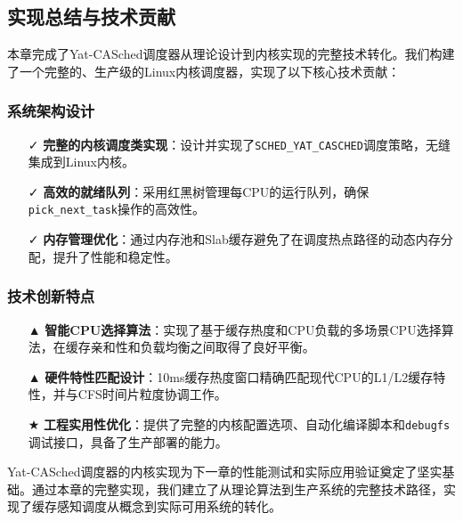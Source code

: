\subsection{实现总结与技术贡献}

本章完成了Yat-CASched调度器从理论设计到内核实现的完整技术转化。我们构建了一个完整的、生产级的Linux内核调度器，实现了以下核心技术贡献：

\subsubsection{系统架构设计}
\begin{itemize}
    \item[✓] \textbf{完整的内核调度类实现}：设计并实现了\texttt{SCHED\_YAT\_CASCHED}调度策略，无缝集成到Linux内核。
    \item[✓] \textbf{高效的就绪队列}：采用红黑树管理每CPU的运行队列，确保\texttt{pick\_next\_task}操作的高效性。
    \item[✓] \textbf{内存管理优化}：通过内存池和Slab缓存避免了在调度热点路径的动态内存分配，提升了性能和稳定性。
\end{itemize}

\subsubsection{技术创新特点}
\begin{itemize}
    \item[▲] \textbf{智能CPU选择算法}：实现了基于缓存热度和CPU负载的多场景CPU选择算法，在缓存亲和性和负载均衡之间取得了良好平衡。
    \item[▲] \textbf{硬件特性匹配设计}：10ms缓存热度窗口精确匹配现代CPU的L1/L2缓存特性，并与CFS时间片粒度协调工作。
    \item[★] \textbf{工程实用性优化}：提供了完整的内核配置选项、自动化编译脚本和\texttt{debugfs}调试接口，具备了生产部署的能力。
\end{itemize}

Yat-CASched调度器的内核实现为下一章的性能测试和实际应用验证奠定了坚实基础。通过本章的完整实现，我们建立了从理论算法到生产系统的完整技术路径，实现了缓存感知调度从概念到实际可用系统的转化。




